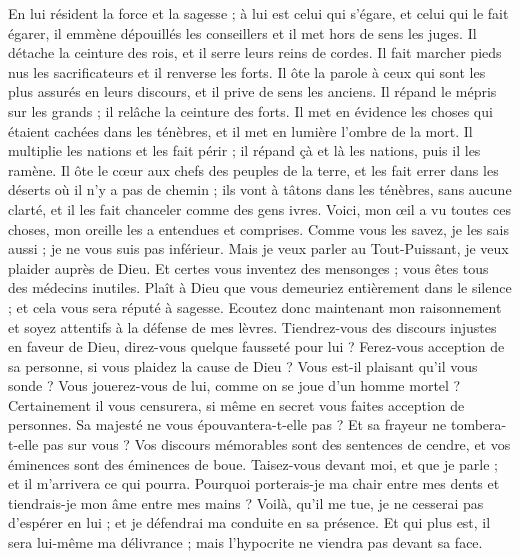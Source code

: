 \begin{multicols}{2}
En lui résident la force et la sagesse ; à lui est celui qui s'égare, et celui qui le fait égarer,
il emmène dépouillés les conseillers et il met hors de sens les juges.
Il détache la ceinture des rois, et il serre leurs reins de cordes.
Il fait marcher pieds nus les sacrificateurs et il renverse les forts.
Il ôte la parole à ceux qui sont les plus assurés en leurs discours, et il prive de sens les anciens.
Il répand le mépris sur les grands ; il relâche la ceinture des forts.
Il met en évidence les choses qui étaient cachées dans les ténèbres, et il met en lumière l'ombre de la mort.
 Il multiplie les nations et les fait périr ; il répand çà et là les nations, puis il les ramène. 
Il ôte le cœur aux chefs des peuples de la terre, et les fait errer dans les déserts où il n'y a pas de chemin ;
ils vont à tâtons dans les ténèbres, sans aucune clarté, et il les fait chanceler comme des gens ivres. 
\VerseOne{}Voici, mon œil a vu toutes ces choses, mon oreille les a entendues et comprises.
Comme vous les savez, je les sais aussi ; je ne vous suis pas inférieur. 
Mais je veux parler au Tout-Puissant, je veux plaider auprès de Dieu.
Et certes vous inventez des mensonges ; vous êtes tous des médecins inutiles.
Plaît à Dieu que vous demeuriez entièrement dans le silence ; et cela vous sera réputé à sagesse.
Ecoutez donc maintenant mon raisonnement et soyez attentifs à la défense de mes lèvres.
Tiendrez-vous des discours injustes en faveur de Dieu, direz-vous quelque fausseté pour lui ? 
Ferez-vous acception de sa personne, si vous plaidez la cause de Dieu ? 
Vous est-il plaisant qu'il vous sonde ? Vous jouerez-vous de lui, comme on se joue d'un homme mortel ? 
Certainement il vous censurera, si même en secret vous faites acception de personnes.
Sa majesté ne vous épouvantera-t-elle pas ? Et sa frayeur ne tombera-t-elle pas sur vous ? 
Vos discours mémorables sont des sentences de cendre, et vos éminences sont des éminences de boue. 
Taisez-vous devant moi, et que je parle ; et il m'arrivera ce qui pourra. 
Pourquoi porterais-je ma chair entre mes dents et tiendrais-je mon âme entre mes mains ?
Voilà, qu'il me tue, je ne cesserai pas d'espérer en lui ; et je défendrai ma conduite en sa présence.
Et qui plus est, il sera lui-même ma délivrance ; mais l'hypocrite ne viendra pas devant sa face.

\end{multicols}
